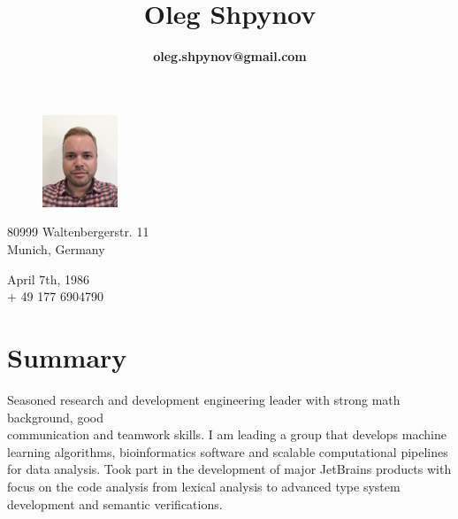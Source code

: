 \documentclass[11pt]{article}
\title{\bfseries\Huge Oleg Shpynov}
\author{\textbf{oleg.shpynov@gmail.com}}
\date{}
\begin{document}
	\maketitle 
	
	\begin{figure}
		\vspace*{-4cm} %
		\hfill\includegraphics[width=0.20\textwidth]{me2020.png}
		\vspace*{-4cm} %
	\end{figure}
	
	
	
	\hspace*{-0.6cm}\begin{minipage}[ht]{0.4\textwidth}
		80999 Waltenbergerstr. 11\\
		Munich, Germany
	\end{minipage}
	\begin{minipage}[ht]{0.4\textwidth}
		April 7th, 1986\\
		+ 49 177 6904790
	\end{minipage}
	\vspace{10pt}

\section*{Summary}
Seasoned research and development engineering leader with strong math background, good \\
communication and teamwork skills. I am leading a group that develops machine learning algorithms, bioinformatics software and scalable computational  pipelines for data analysis. Took part in the development of major JetBrains products with focus on the code analysis from lexical analysis to advanced type system development and semantic verifications.
\end{document}
